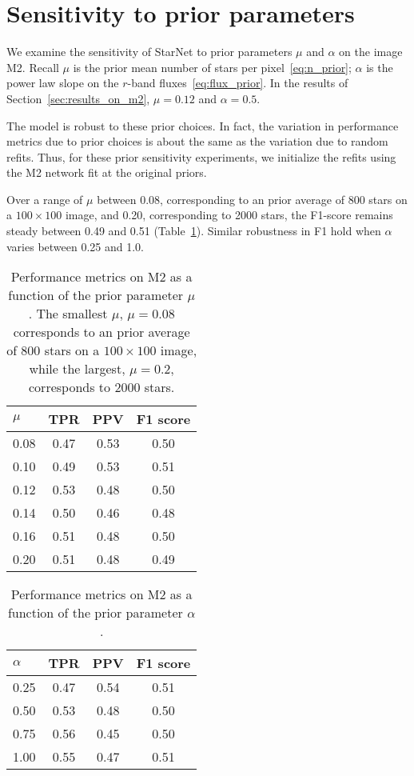 \section{Sensitivity to prior parameters}
\label{sec:prior_sensitivity}

We examine the sensitivity of StarNet to prior parameters $\mu$ and $\alpha$ on the image M2. 
Recall $\mu$ is the prior mean number of stars per pixel~\eqref{eq:n_prior};
$\alpha$ is the power law slope on the $r$-band fluxes~\eqref{eq:flux_prior}. 
In the results of Section~\ref{sec:results_on_m2}, $\mu=0.12$ and  $\alpha = 0.5$. 

The model is robust to these prior choices. 
In fact, the variation in performance metrics
due to prior choices is about the same as the 
variation due to random refits.
Thus, for these prior sensitivity experiments, 
we initialize the refits using the M2 network
fit at the original priors. 

Over a  range of $\mu$ between 0.08, corresponding to 
an prior average of 800 stars on a $100\times100$ image, 
and 0.20, corresponding to 2000 stars, 
the F1-score remains steady between 0.49 and 0.51 (Table~\ref{tab:mu_sensitivity}). 
Similar robustness in F1 hold when $\alpha$ varies between 
0.25 and 1.0. 

\begin{table}[!tb]
\centering
\caption{Performance metrics on M2 as a function of 
the prior parameter $\mu$. 
The smallest $\mu$, $\mu = 0.08$ corresponds to 
an prior average of 800 stars on a $100\times100$ image, 
while the largest, $\mu = 0.2$, corresponds to 2000 stars. }
\label{tab:mu_sensitivity}
\begin{tabular}{l|ccc}
\toprule
$\mu$ &   TPR &   PPV &  F1 score \\
\midrule
0.08 &  0.47 &  0.53 & 0.50 \\
0.10 &  0.49 &  0.53 & 0.51 \\
0.12 &  0.53 &  0.48 & 0.50 \\
0.14 &  0.50 &  0.46 & 0.48 \\
0.16 &  0.51 &  0.48 & 0.50 \\
0.20 &  0.51 &  0.48 & 0.49 \\
\bottomrule
\end{tabular}
\end{table}


\begin{table}[!tb]
\centering
\caption{Performance metrics on M2 as a function of 
the prior parameter $\alpha$. }
\label{tab:alpha_sensitivity}
\begin{tabular}{l|ccc}
\toprule
$\alpha$ &   TPR &   PPV &  F1 score \\
\midrule
0.25 &  0.47 &  0.54 & 0.51 \\
0.50 &  0.53 &  0.48 & 0.50 \\
0.75 &  0.56 &  0.45 & 0.50 \\
1.00 &  0.55 &  0.47 & 0.51 \\
\bottomrule
\end{tabular}
\end{table}

